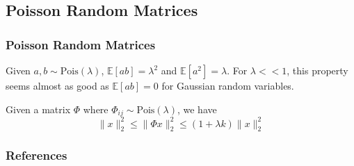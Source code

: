\documentclass[aspectratio=34]{beamer}
\begin{document}
\subsection{Poisson Random Matrices}
\begin{frame}
    \frametitle{Poisson Random Matrices}
    Given $a,b \sim \text{Pois}(\lambda)$, $\mathbb{E}[ab] = \lambda^2$ and $\mathbb{E}[a^2] = \lambda$.
    For $\lambda << 1$, this property seems almost as good as $\mathbb{E}[ab] = 0$ for Gaussian random variables. 
    
    \begin{Lemma}
    	
    Given a matrix $\Phi$ where $\Phi_{ij} \sim \text{Pois}(\lambda)$, we have
    \[\|x\|_2^2 \le \|\Phi x\|_2^2 \le (1+\lambda k)\|x\|_2^2\]	
    \end{Lemma}

\end{frame}

\begin{frame}[t,allowframebreaks]{}
\frametitle{References}



\end{frame}
\end{document}
